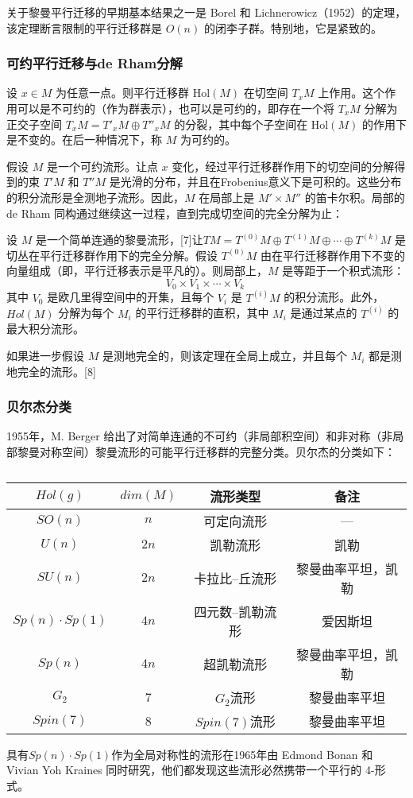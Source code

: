 关于黎曼平行迁移的早期基本结果之一是 Borel 和 Lichnerowicz（1952）的定理，该定理断言限制的平行迁移群是 \(O(n)\) 的闭李子群。特别地，它是紧致的。
\subsubsection{可约平行迁移与de Rham分解 } 
设 \( x \in M \) 为任意一点。则平行迁移群 \( \text{Hol}(M) \) 在切空间 \( T_xM \) 上作用。这个作用可以是不可约的（作为群表示），也可以是可约的，即存在一个将 \( T_xM \) 分解为正交子空间 \( T_xM = T'_xM \oplus T''_xM \) 的分裂，其中每个子空间在 \( \text{Hol}(M) \) 的作用下是不变的。在后一种情况下，称 \( M \) 为可约的。

假设 \( M \) 是一个可约流形。让点 \( x \) 变化，经过平行迁移群作用下的切空间的分解得到的束 \( T'M \) 和 \( T''M \) 是光滑的分布，并且在Frobenius意义下是可积的。这些分布的积分流形是全测地子流形。因此，\( M \) 在局部上是 \( M' \times M'' \) 的笛卡尔积。局部的 de Rham 同构通过继续这一过程，直到完成切空间的完全分解为止：

设 \( M \) 是一个简单连通的黎曼流形，[7]让\( TM = T^{(0)}M \oplus T^{(1)}M \oplus \cdots \oplus T^{(k)}M \) 是切丛在平行迁移群作用下的完全分解。假设 \( T^{(0)}M \) 由在平行迁移群作用下不变的向量组成（即，平行迁移表示是平凡的）。则局部上，\( M \) 是等距于一个积式流形：
\[
V_0 \times V_1 \times \cdots \times V_k~
\]
其中 \( V_0 \) 是欧几里得空间中的开集，且每个 \( V_i \) 是 \( T^{(i)}M \) 的积分流形。此外，\( Hol(M) \) 分解为每个 \( M_i \) 的平行迁移群的直积，其中 \( M_i \) 是通过某点的 \( T^{(i)} \) 的最大积分流形。

如果进一步假设 \( M \) 是测地完全的，则该定理在全局上成立，并且每个 \( M_i \) 都是测地完全的流形。[8]
\subsubsection{贝尔杰分类}  
1955年，M. Berger 给出了对简单连通的不可约（非局部积空间）和非对称（非局部黎曼对称空间）黎曼流形的可能平行迁移群的完整分类。贝尔杰的分类如下：
\begin{table}[ht]
\centering
\caption\label{WZQ}
\begin{tabular}{|c|c|c|c|}
\hline \(Hol(g)\)&\(dim(M)\)&\textbf{流形类型}&\textbf{备注} \\
\hline \(SO(n)\)&\(n\)&可定向流形&— \\
\hline \(U(n)\)&\(2n\)&凯勒流形&凯勒\\  
\hline \(SU(n)\)&\(2n\)&卡拉比–丘流形&黎曼曲率平坦，凯勒\\  
\hline \(Sp(n)\cdot Sp(1)\)&\(4n\)&四元数–凯勒流形&爱因斯坦 \\ 
\hline \(Sp(n)\)&\(4n\)&超凯勒流形&黎曼曲率平坦，凯勒 \\ 
\hline \(G_2\)&7&\(G_2\)流形&黎曼曲率平坦 \\ 
\hline \(Spin(7)\)&8&\(Spin(7)\)流形&黎曼曲率平坦\\
\hline 
\end{tabular}
\end{table}
具有\(Sp(n)\cdot Sp(1)\)作为全局对称性的流形在1965年由 Edmond Bonan 和 Vivian Yoh Kraines 同时研究，他们都发现这些流形必然携带一个平行的 4-形式。

